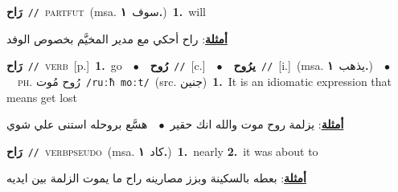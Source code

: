 \documentclass[10pt,a4paper,twoside]{article} %
\begin{document}
\begin{multicols}{2}
{\setlength\topsep{0pt}\textbf{\foreignlanguage{arabic}{رَاح}}\ {\color{gray}\texttt{//}\color{black}}\ \textsc{part\textunderscore fut}\ \color{gray}(msa. \foreignlanguage{arabic}{سوف}~\foreignlanguage{arabic}{\textbf{١.}})\color{black}\ \textbf{1.}~will\  \begin{flushright}\color{gray}\foreignlanguage{arabic}{\textbf{\underline{\foreignlanguage{arabic}{أمثلة}}}: راح أحكي مع مدير المخيَّم بخصوص الوفد}\end{flushright}\color{black}} \vspace{2mm}

{\setlength\topsep{0pt}\textbf{\foreignlanguage{arabic}{رَاح}}\ {\color{gray}\texttt{//}\color{black}}\ \textsc{verb}\ [p.]\ \textbf{1.}~go\ \ $\bullet$\ \ \setlength\topsep{0pt}\textbf{\foreignlanguage{arabic}{رُوح}}\ {\color{gray}\texttt{//}\color{black}}\ [c.]\ \ $\bullet$\ \ \setlength\topsep{0pt}\textbf{\foreignlanguage{arabic}{يرُوح}}\ {\color{gray}\texttt{//}\color{black}}\ [i.]\ \color{gray}(msa. \foreignlanguage{arabic}{يذهب}~\foreignlanguage{arabic}{\textbf{١.}})\color{black}\ \ $\bullet$\ \ \textsc{ph.} \color{gray} \foreignlanguage{arabic}{رُوح مُوت}\color{black}\ {\color{gray}\texttt{/{\sffamily ruːħ moːt}/}\color{black}}\ \color{gray}(src. \foreignlanguage{arabic}{جنين})\color{black}\ \textbf{1.}~It is an idiomatic expression that means get lost\  \begin{flushright}\color{gray}\foreignlanguage{arabic}{\textbf{\underline{\foreignlanguage{arabic}{أمثلة}}}: يزلمة روح موت والله انك حقير\ $\bullet$\ \  هسَّع بروحله استنى علي شوي}\end{flushright}\color{black}} \vspace{2mm}

{\setlength\topsep{0pt}\textbf{\foreignlanguage{arabic}{رَاح}}\ {\color{gray}\texttt{//}\color{black}}\ \textsc{verb\textunderscore pseudo}\ \color{gray}(msa. \foreignlanguage{arabic}{كاد}~\foreignlanguage{arabic}{\textbf{١.}})\color{black}\ \textbf{1.}~nearly  \textbf{2.}~it was about to\  \begin{flushright}\color{gray}\foreignlanguage{arabic}{\textbf{\underline{\foreignlanguage{arabic}{أمثلة}}}: بعطه بالسكينة وبزز مصارينه راح ما يموت الزلمة بين ايديه}\end{flushright}\color{black}} \vspace{2mm}


\end{multicols}
\end{document}
